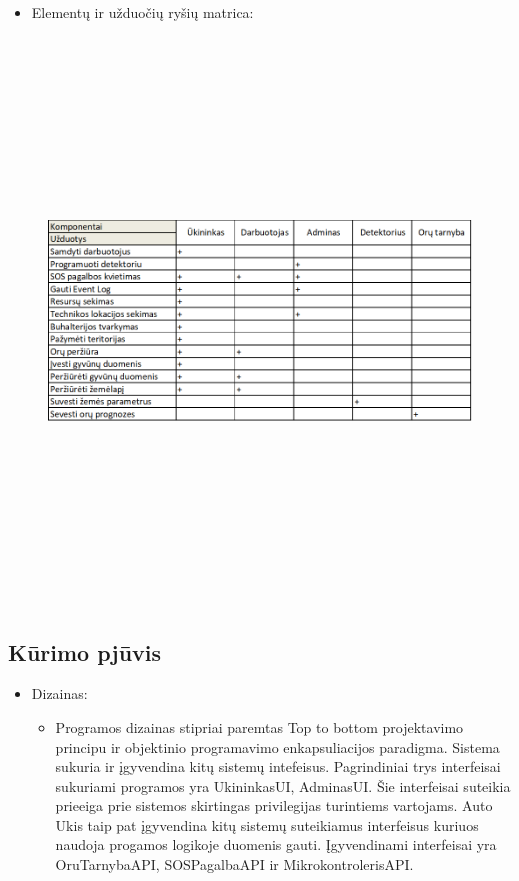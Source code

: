 \documentclass[oneside]{VUMIFPSkursinis}
\begin{document}
\begin{itemize}
		\item Elementų ir užduočių ryšių matrica:
\end{itemize}
	\begin{figure}[H]
	\centering	
\includegraphics[width=15cm,height=15cm,keepaspectratio]{KomUzd2.png}
\caption{}
\label{fig:elementu_ir_uzd_matrica}
\end{figure}


\subsection{Kūrimo pjūvis}
	

	\begin{itemize}
		\item Dizainas:
		\begin{itemize}
			\item Programos dizainas stipriai paremtas Top to bottom projektavimo principu ir objektinio programavimo enkapsuliacijos paradigma. Sistema sukuria ir įgyvendina kitų sistemų intefeisus. Pagrindiniai trys interfeisai sukuriami programos yra UkininkasUI, AdminasUI. Šie interfeisai suteikia prieeiga prie sistemos skirtingas privilegijas turintiems vartojams. Auto Ukis taip pat įgyvendina kitų sistemų suteikiamus interfeisus kuriuos naudoja progamos logikoje duomenis gauti. Įgyvendinami interfeisai yra OruTarnybaAPI, SOSPagalbaAPI ir MikrokontrolerisAPI.
		\end{itemize}
	\end{itemize}
\end{document}
